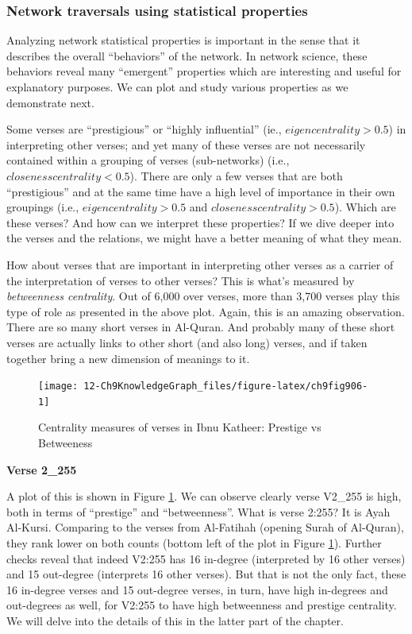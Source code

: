 \documentclass[
]{article}
\begin{document}
\hypertarget{network-traversals-using-statistical-properties}{%
\subsubsection{Network traversals using statistical properties}\label{network-traversals-using-statistical-properties}}

Analyzing network statistical properties is important in the sense that it describes the overall ``behaviors'' of the network. In network science, these behaviors reveal many ``emergent'' properties which are interesting and useful for explanatory purposes. We can plot and study various properties as we demonstrate next.

Some verses are ``prestigious'' or ``highly influential'' (ie., \(eigen centrality > 0.5\)) in interpreting other verses; and yet many of these verses are not necessarily contained within a grouping of verses (sub-networks) (i.e., \(closeness centrality < 0.5\)). There are only a few verses that are both ``prestigious'' and at the same time have a high level of importance in their own groupings (i.e., \(eigen centrality > 0.5\) and \(closeness centrality > 0.5\)). Which are these verses? And how can we interpret these properties? If we dive deeper into the verses and the relations, we might have a better meaning of what they mean.

How about verses that are important in interpreting other verses as a carrier of the interpretation of verses to other verses? This is what's measured by \emph{betweenness centrality}. Out of 6,000 over verses, more than 3,700 verses play this type of role as presented in the above plot. Again, this is an amazing observation. There are so many short verses in Al-Quran. And probably many of these short verses are actually links to other short (and also long) verses, and if taken together bring a new dimension of meanings to it.

\begin{figure}

{\centering \texttt{[image: 12-Ch9KnowledgeGraph\_files/figure-latex/ch9fig906-1]} 

}

\caption{Centrality measures of verses in Ibnu Katheer: Prestige vs Betweeness}\label{fig:ch9fig906}
\end{figure}

\textbf{Verse 2\_255}

A plot of this is shown in Figure \ref{fig:ch9fig906}. We can observe clearly verse V2\_255 is high, both in terms of ``prestige'' and ``betweenness''. What is verse 2:255? It is Ayah Al-Kursi. Comparing to the verses from Al-Fatihah (opening Surah of Al-Quran), they rank lower on both counts (bottom left of the plot in Figure \ref{fig:ch9fig906}). Further checks reveal that indeed V2:255 has 16 in-degree (interpreted by 16 other verses) and 15 out-degree (interprets 16 other verses). But that is not the only fact, these 16 in-degree verses and 15 out-degree verses, in turn, have high in-degrees and out-degrees as well, for V2:255 to have high betweenness and prestige centrality. We will delve into the details of this in the latter part of the chapter.
\end{document}
